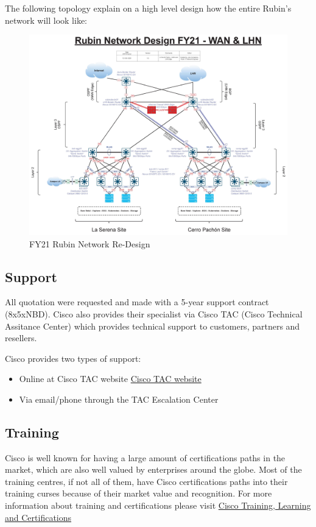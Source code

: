   The following topology explain on a high level design how the entire Rubin's network will look like:

  \begin{figure}
    \includegraphics[width=15cm]{images/fy21-rubin-network.jpg}
    \centering
    \caption{FY21 Rubin Network Re-Design}
  \end{figure}

\newpage

  \subsection{Support}

  All quotation were requested and made with a 5-year support contract (8x5xNBD). Cisco also provides their specialist via Cisco TAC (Cisco Technical Assitance Center) which provides technical support to customers, partners and resellers.

  Cisco provides two types of support:

  \begin{itemize}
    \item Online at Cisco TAC website \href{http://www.cisco.com/tac}{Cisco TAC website}
    \item Via email/phone through the TAC Escalation Center
  \end{itemize}

  \subsection{Training}

  Cisco is well known for having a large amount of certifications paths in the market, which are also well valued by enterprises around the globe. Most of the training centres, if not all of them, have Cisco certifications paths into their training curses because of their market value and recognition. For more information about training and certifications please visit \href{https://www.cisco.com/c/en/us/training-events/training-certifications.html}{Cisco Training, Learning and Certifications} 




